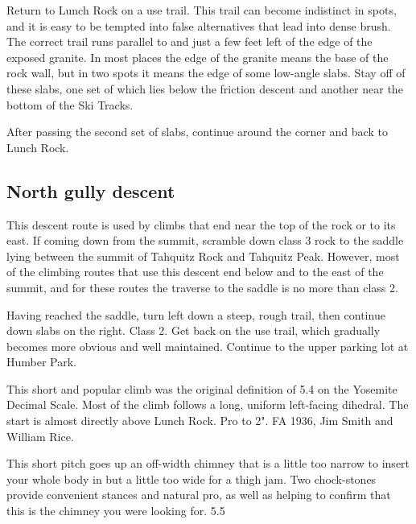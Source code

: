 \documentclass{tahquitz}
\begin{document}
Return to Lunch Rock on a use trail. This trail can become indistinct in spots,
and it is easy to be tempted into false alternatives that lead into dense
brush. The correct trail runs parallel to and just a few feet left of the
edge of the exposed granite. In most places the edge of the granite means the base
of the rock wall, but in two spots it means the edge of some low-angle
slabs. Stay off of these slabs, one set of which lies
below the friction descent
and another near the bottom of the Ski Tracks.

After passing the second set of slabs,
continue around the corner and back to Lunch Rock.

\subsection{North gully descent}\label{subsec:north-gully-descent}

This descent route is used by climbs that end near the top of the rock
or to its east. If coming down from the summit, scramble down class 3
rock to the saddle lying between the summit of Tahquitz Rock and
Tahquitz Peak. However, most of the climbing routes that use this descent end below and to
the east of the summit, and for these routes the traverse to the saddle is no more than
class 2.

Having reached the saddle, turn left down a steep, rough trail, then continue down slabs on the right.
Class 2. Get back on the use trail, which gradually becomes more obvious and well maintained.
Continue to the upper parking lot at Humber Park.



\normalparindent





This short and popular climb was the original definition of 5.4 on the Yosemite Decimal Scale.
Most of the climb follows a long, uniform left-facing dihedral.
The start is almost directly above Lunch Rock. Pro to 2". FA
1936, Jim Smith and William Rice.

 This short pitch goes up an off-width chimney that is a little too
narrow to insert your whole body in but a little too wide for a thigh jam.
Two chock-stones provide convenient stances and natural pro, as well as helping
to confirm that this is the chimney you were looking for. 5.5
\end{document}
